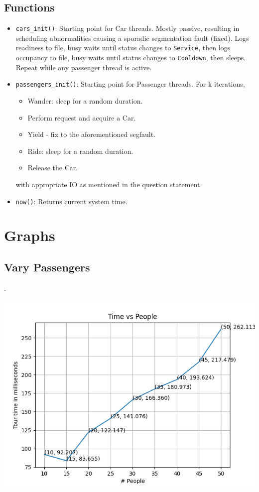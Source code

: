 \documentclass{amsart}
\begin{document}
\subsection{Functions}
\begin{itemize}
    \item \texttt{cars\_init()}: Starting point for Car threads. Mostly passive, resulting in scheduling abnormalities causing a sporadic segmentation fault (fixed). Logs readiness to file, busy waits until status changes to \texttt{Service}, then logs occupancy to file, busy waits until status changes to \texttt{Cooldown}, then sleeps. Repeat while any passenger thread is active.
    \item \texttt{passengers\_init()}: Starting point for Passenger threads. For k iterations, \begin{itemize}
        \item Wander: sleep for a random duration.
        \item Perform request and acquire a Car.
        \item Yield - fix to the aforementioned segfault.
        \item Ride: sleep for a random duration.
        \item Release the Car.
    \end{itemize}
    with appropriate IO as mentioned in the question statement.
    \item \texttt{now()}: Returns current system time.
\end{itemize}

\section{Graphs}
\subsection{Vary Passengers}.

\includegraphics[scale = 0.9]{people.png}
\end{document}

